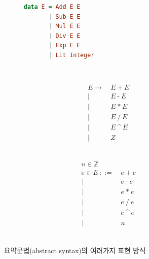 \documentclass[b5paper,chapter,figtabcapt]{oblivoir}
\begin{document}
\begin{figure}[H]\vspace*{-4ex}
\begin{subfigure}[b]{0.3\textwidth}
\begin{lstlisting}[language=Haskell,basicstyle=\linespread{1.1}\ttfamily]
data E = Add E E
       | Sub E E
       | Mul E E
       | Div E E
       | Exp E E
       | Lit Integer
\end{lstlisting}
~\vspace{-3.3ex}
\end{subfigure}
\hfill
\begin{subfigure}[b]{0.3\textwidth}\addtolength{\jot}{-.2em}
\begin{align*}
E  \to ~& E ~\texttt{+}~ E
\\ \mid~& E ~\texttt{-}~ E
\\ \mid~& E ~\texttt{*}~ E
\\ \mid~& E ~\texttt{/}~ E
\\ \mid~& E ~\texttt{\char`^}~ E
\\ \mid~& Z
\end{align*}
~\vspace{-4ex}
\end{subfigure}
\hfill
\begin{subfigure}[b]{0.3\textwidth}\addtolength{\jot}{-.2em}
\begin{align*}
n\in \mathbb{Z} \qquad~~& \\
e\in E ~
   ::= ~& e ~\texttt{+}~ e
\\ \mid~& e ~\texttt{-}~ e
\\ \mid~& e ~\texttt{*}~ e
\\ \mid~& e ~\texttt{/}~ e
\\ \mid~& e ~\texttt{\char`^}~ e
\\ \mid~& n_{\phantom{g}}
\end{align*}
~\vspace{-4ex}
\end{subfigure}
\caption{요약문법(abstract syntax)의 여러가지 표현 방식
         \label{fig:AbsSyn}}
\end{figure}
\end{document}

